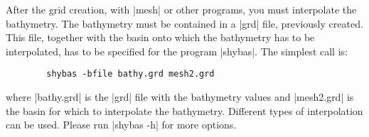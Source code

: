
%
%
%
%
%
%
%

After the grid creation, with |mesh| or other programs, you must interpolate the
bathymetry.
The bathymetry must be contained in a |grd| file, previously created.
This file, together with the basin onto which the bathymetry has to be 
interpolated, has to be specified for the program |shybas|.
The simplest call is: 

\begin{verbatim}
        shybas -bfile bathy.grd mesh2.grd
\end{verbatim}

where |bathy.grd| is the |grd| file with the bathymetry values and
|mesh2.grd| is the basin for which to interpolate the bathymetry.
Different types of interpolation can be used. Please run
|shybas -h| for more options.



%


